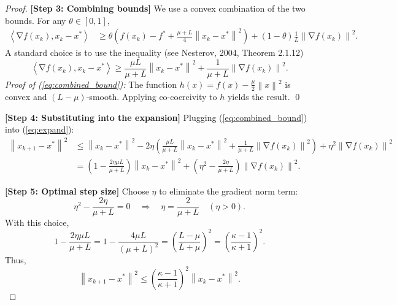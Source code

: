 \documentclass[11pt]{article}
\DeclareMathOperator{\grad}{\nabla}
\newcommand{\norm}[1]{\left\|#1\right\|}
\newcommand{\inner}[2]{\left\langle #1, #2 \right\rangle}
\begin{document}
\begin{proof}
    \textbf{[Step 3: Combining bounds]} We use a convex combination of the two bounds. For any $\theta \in [0,1]$,
    \begin{align}
        \inner{\grad f(x_k)}{x_k - x^*}
        &\ge \theta \left( f(x_k) - f^* + \frac{\mu + L}{4}\norm{x_k - x^*}^2 \right)
           + (1-\theta) \frac{1}{L}\norm{\grad f(x_k)}^2.
    \end{align}
    A standard choice is to use the inequality (see Nesterov, 2004, Theorem 2.1.12)
    \begin{equation}
        \inner{\grad f(x_k)}{x_k - x^*} \ge \frac{\mu L}{\mu + L}\norm{x_k - x^*}^2 + \frac{1}{\mu + L}\norm{\grad f(x_k)}^2.
        \label{eq:combined_bound}
    \end{equation}
    \textit{Proof of (\ref{eq:combined_bound}):} The function $h(x) = f(x) - \frac{\mu}{2}\norm{x}^2$ is convex and $(L-\mu)$-smooth. Applying co-coercivity to $h$ yields the result. \qed

    \textbf{[Step 4: Substituting into the expansion]} Plugging (\ref{eq:combined_bound}) into (\ref{eq:expand}):
    \begin{align}
        \norm{x_{k+1} - x^*}^2
        &\le \norm{x_k - x^*}^2
           - 2\eta \left( \frac{\mu L}{\mu + L}\norm{x_k - x^*}^2 + \frac{1}{\mu + L}\norm{\grad f(x_k)}^2 \right)
           + \eta^2 \norm{\grad f(x_k)}^2 \\
        &= \left( 1 - \frac{2\eta \mu L}{\mu + L} \right) \norm{x_k - x^*}^2
           + \left( \eta^2 - \frac{2\eta}{\mu + L} \right) \norm{\grad f(x_k)}^2.
    \end{align}

    \textbf{[Step 5: Optimal step size]} Choose $\eta$ to eliminate the gradient norm term:
    \begin{equation}
        \eta^2 - \frac{2\eta}{\mu + L} = 0 \quad \Rightarrow \quad \eta = \frac{2}{\mu + L} \quad (\eta > 0).
    \end{equation}
    With this choice,
    \begin{equation}
        1 - \frac{2\eta \mu L}{\mu + L} = 1 - \frac{4\mu L}{(\mu + L)^2} = \left( \frac{L - \mu}{L + \mu} \right)^2 = \left( \frac{\kappa - 1}{\kappa + 1} \right)^2.
    \end{equation}
    Thus,
    \begin{equation}
        \norm{x_{k+1} - x^*}^2 \le \left( \frac{\kappa - 1}{\kappa + 1} \right)^2 \norm{x_k - x^*}^2.
        \label{eq:recursion}
    \end{equation}


\end{proof}
\end{document}
